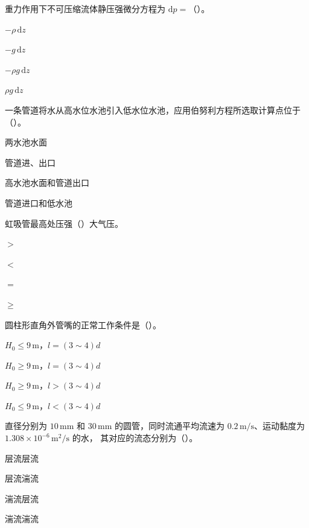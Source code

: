 \begin{ti}
  \item 重力作用下不可压缩流体静压强微分方程为 $\mathrm{d}p=$（\quad）。
  \hfill{}
  \begin{choices}
    \item $-\rho\,\mathrm{d}z$
    \item $-g\,\mathrm{d}z$
    \item $-\rho g\,\mathrm{d}z$
    \item $\rho g\,\mathrm{d}z$
  \end{choices}

  \item 一条管道将水从高水位水池引入低水位水池，应用伯努利方程所选取计算点位于（\quad）。
  \hfill{}
  \begin{choices}
    \item 两水池水面
    \item 管道进、出口
    \item 高水池水面和管道出口
    \item 管道进口和低水池
  \end{choices}

  \item 虹吸管最高处压强（\quad）大气压。\hfill{}
  \begin{choices}
    \item $>$
    \item $<$
    \item $=$
    \item $\ge$
  \end{choices}

  \item 圆柱形直角外管嘴的正常工作条件是（\quad）。\hfill{}
  \begin{choices}
    \item $H_0\le9\,\mathrm{m}$，$l=(3\sim4)d$
    \item $H_0\ge9\,\mathrm{m}$，$l=(3\sim4)d$
    \item $H_0\ge9\,\mathrm{m}$，$l>(3\sim4)d$
    \item $H_0\le9\,\mathrm{m}$，$l<(3\sim4)d$
  \end{choices}

  \item 直径分别为 $10\,\mathrm{mm}$ 和 $30\,\mathrm{mm}$ 的圆管，同时流通平均流速为
  $0.2\,\mathrm{m/s}$、运动黏度为 $1.308\times10^{-6}\,\mathrm{m^2/s}$ 的水，
  其对应的流态分别为（\quad）。\hfill{}
  \begin{choices}
    \item 层流\quad 层流
    \item 层流\quad 湍流
    \item 湍流\quad 层流
    \item 湍流\quad 湍流
  \end{choices}


\end{ti}
